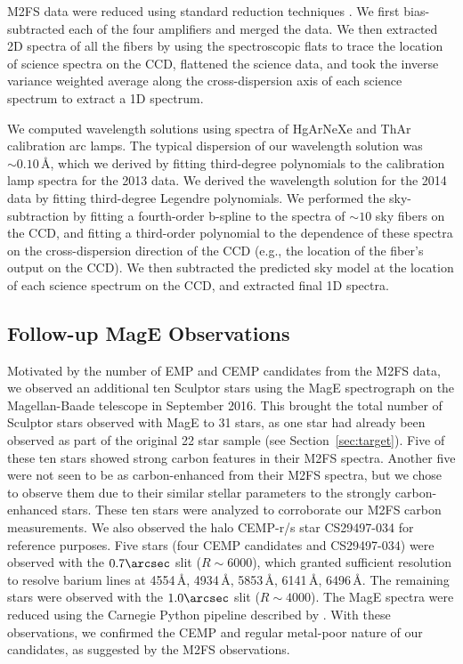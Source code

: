 \documentclass{emulateapj-rtx4}
\begin{document}
M2FS data were reduced using standard reduction techniques \citep{obg+16}. 
We first bias-subtracted each of the four amplifiers and merged the data.
We then extracted 2D spectra of all the fibers by using the spectroscopic flats to trace the location of 
science spectra on the CCD, flattened the science data, 
and took the inverse variance weighted average along the cross-dispersion axis
 of each science spectrum to extract a 1D spectrum.

We computed wavelength solutions using spectra of HgArNeXe and ThAr
calibration arc lamps. The typical dispersion of our wavelength solution was $\sim0.10$\,\AA, which
we derived by fitting third-degree polynomials to the calibration lamp spectra for the 2013 data. We derived the wavelength solution for the 2014 data by fitting third-degree Legendre polynomials.
We performed the sky-subtraction by fitting a fourth-order b-spline to the spectra of $\sim10$ sky fibers 
on the CCD, and fitting a third-order polynomial to the dependence of these spectra on the cross-dispersion direction
of the CCD (e.g., the location of the fiber's output on the CCD). We then subtracted the predicted sky model 
at the location of each science spectrum on the CCD, and extracted final 1D spectra.

\subsection{Follow-up MagE Observations}
\label{sec:MagE}
Motivated by the number of EMP and CEMP candidates from the M2FS data, 
we observed an additional ten Sculptor stars using the MagE spectrograph on the Magellan-Baade telescope in September 2016. 
This brought the total number of Sculptor stars observed with MagE to 31 stars, as one star had already been observed as part 
of the original 22 star sample (see Section~\ref{sec:target}).
Five of these ten stars showed strong carbon features in their M2FS spectra.
Another five were not seen to be as carbon-enhanced
from their M2FS spectra, but we chose to observe them due to their similar stellar parameters to the strongly carbon-enhanced stars.
These ten stars were analyzed to corroborate our M2FS carbon measurements.
We also observed the halo CEMP-r/s star CS29497-034 for reference purposes.
Five stars (four CEMP candidates and CS29497-034) were observed with the $0.7\arcsec$ slit ($R\sim6000$), which 
granted sufficient resolution to resolve barium lines at 4554\,\AA, 4934\,\AA, 5853\,\AA, 6141\,\AA,  6496\,\AA. 
The remaining stars were observed with the $1.0\arcsec$ slit ($R\sim4000$). The MagE spectra were reduced using the Carnegie Python
pipeline described by \citet{k+03}. With these observations, we confirmed the CEMP and regular metal-poor nature of our candidates,
as suggested by the M2FS observations.
\end{document}

